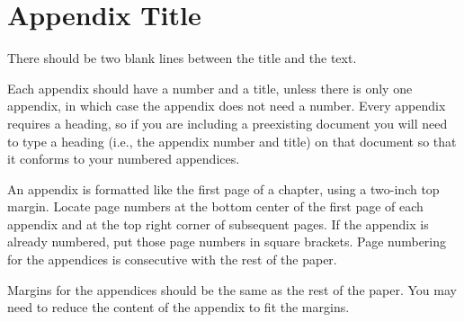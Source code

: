 \documentclass{sblreport}
\begin{document}
\appendix

\chapter{Appendix Title}

There should be two blank lines between the title and the text.

Each appendix should have a number and a title, unless there is only one
appendix, in which case the appendix does not need a number. Every appendix
requires a heading, so if you are including a preexisting document you will
need to type a heading (i.e., the appendix number and title) on that document
so that it conforms to your numbered appendices.

An appendix is formatted like the first page of a chapter, using a two-inch
top margin.  Locate page numbers at the bottom center of the first page of
each appendix and at the top right corner of subsequent pages. If the appendix
is already numbered, put those page numbers in square brackets. Page numbering
for the appendices is consecutive with the rest of the paper.

Margins for the appendices should be the same as the rest of the paper. You
may need to reduce the content of the appendix to fit the margins.

\nocite{NIDNTT, Jastrow, DMBI, mclay:2006, oday:intertextuality, vonrad:1990}

\printbibliography[heading=bibintoc]
\end{document}
